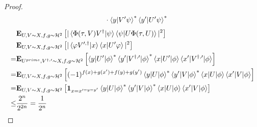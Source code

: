 \documentclass[manuscript,screen,review]{acmart}
\begin{document}
\begin{proof}
\begin{equation*}
\begin{split}
      & \ \ \ \ \ \ \cdot  \braket{y |V^{\prime} \psi}^{*}\braket{y^{\prime}
      |U^{\prime} \psi}^{*}
    \end{split}
  \end{equation*}
  \begin{equation*}
    \begin{split}
      & \exppm{ |\braket{\Phi(\tau,V)
      V^{\dagger}|\psi}\braket{\psi|U\Phi(\tau,U)}|^{2} }{U,V \sim X , f,g\sim
      \mathcal{H}^2} \\
      & \exppm{ |\braket{\varphi V^{\prime,
      \dagger}|x}\braket{x|U^{\prime}\varphi}|^{2} }{U,V \sim X , f,g\sim
      \mathcal{H}^2}  \\
      = & \exppm{ \braket{y|U^{\prime}|\phi}^{*} \braket{y^{\prime}|V^{\dagger,
        \prime}|\phi}^{*} \braket{x|U^{\prime}|\phi}
        \braket{x^{\prime}|V^{\dagger,
      \prime}|\phi}}{ U^{prime},V^{\dagger, \prime} \sim X , f,g\sim
      \mathcal{H}^2}
      \\
      = & \exppm{ (-1)^{f(x)+g(x^{\prime})+f(y)+g(y^{\prime})}
        \braket{y|U|\phi}^{*} \braket{y^{\prime}|V|\phi}^{*} \braket{x|U|\phi}
      \braket{x^{\prime}|V|\phi}}{ U,V \sim X , f,g\sim \mathcal{H}^2} \\
      = & \exppm{ \mathbf{1}_{x=x^{\prime=y=y^{\prime}}} \braket{y|U|\phi}^{*}
        \braket{y^{\prime}|V|\phi}^{*} \braket{x|U|\phi}
      \braket{x^{\prime}|V|\phi}}{
      U,V \sim X , f,g\sim \mathcal{H}^2} \\
      \le &\frac{2^{n}}{2^{2n}} = \frac{1}{2^n}
    \end{split}
  \end{equation*}

\end{proof}
\end{document}
